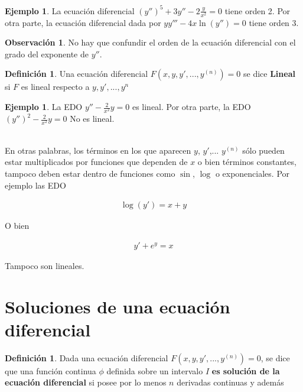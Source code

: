 \documentclass{article}
\theoremstyle{plain}
\theoremstyle{definition}
\newtheorem{defin}[thm]{Definición}
\newtheorem{ejem}[thm]{Ejemplo}
\newtheorem{rmk}[thm]{Observación}
\begin{document}
\begin{ejem}La ecuación diferencial $\displaystyle (y'')^5+3 y''-2\frac{y}{x^2}=0$ tiene orden 2. Por otra parte, la ecuación diferencial dada por $\displaystyle yy'''-4x\ln(y'')=0$ tiene orden 3. \\
\end{ejem}

\begin{rmk}No hay que confundir el orden de la ecuación diferencial con el grado del exponente de $y''$. \\
\end{rmk}




\begin{defin}Una ecuación diferencial $F(x,y,y',...,y^{(n)})=0$ se dice \textbf{Lineal} si $F$ es lineal respecto a $y,y',... , y^{n}$ \\
\end{defin}

\begin{ejem}La EDO $\displaystyle y''-\frac{2}{x^2} y= 0$ es lineal. Por otra parte, la EDO $\displaystyle (y'')^2-\frac{2}{x^2} y= 0$ No es lineal. \\ \\
\end{ejem}


En otras palabras, los términos en los que aparecen  $y$, $y'$,... $y^{(n)}$ sólo pueden estar multiplicados por funciones que dependen de $x$ o bien términos constantes, tampoco deben estar dentro de funciones como $\sin$, $\log$ o exponenciales. Por ejemplo las EDO

\begin{align*}
    \log(y') = x+y
\end{align*}

O bien

\begin{align*}
    y'+e^y = x
\end{align*}

Tampoco son lineales.

\newpage

\section{Soluciones de una ecuación diferencial}


\begin{defin}Dada una ecuación diferencial $F(x,y,y',... ,y^{(n)})=0$, se dice que una función continua $\phi$ definida sobre un intervalo $I$ \textbf{es solución de  la ecuación diferencial} si posee por lo menos $n$ derivadas continuas y además
\end{defin}
\end{document}
